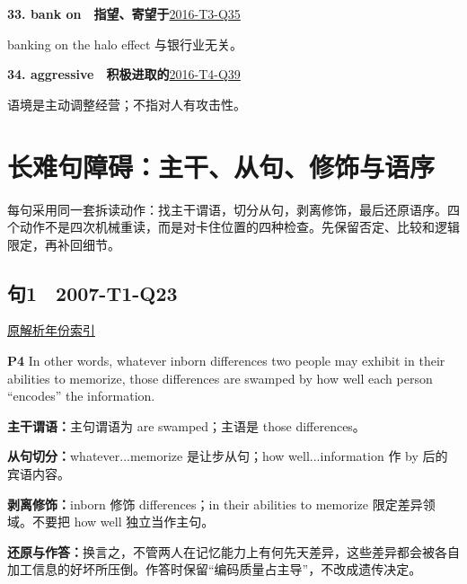 \documentclass[11pt,a4paper]{article}
\begin{document}
\noindent\textbf{33. bank on　指望、寄望于}\hfill \hyperref[idx-2016-T3-Q35]{2016-T3-Q35}\par
banking on the halo effect 与银行业无关。\par
{}\noindent\textbf{34. aggressive　积极进取的}\hfill \hyperref[idx-2016-T4-Q39]{2016-T4-Q39}\par
语境是主动调整经营；不指对人有攻击性。\par
\clearpage\section{长难句障碍：主干、从句、修饰与语序}\label{syntax}
每句采用同一套拆读动作：找主干谓语，切分从句，剥离修饰，最后还原语序。四个动作不是四次机械重读，而是对卡住位置的四种检查。先保留否定、比较和逻辑限定，再补回细节。\par
{}
\subsection{句1　2007-T1-Q23}
\noindent \href{https://zj139.github.io/math-notes/english/a69829b7fe6a2f532d31c053/\#q23}{原解析}\quad \hyperref[idx-2007-T1-Q23]{年份索引}
\begin{evidence}\textbf{P4} In other words, whatever inborn differences two people may exhibit in their abilities to memorize, those differences are swamped by how well each person “encodes” the information.\end{evidence}
\noindent\textbf{主干谓语：}主句谓语为 are swamped；主语是 those differences。\par
\noindent\textbf{从句切分：}whatever...memorize 是让步从句；how well...information 作 by 后的宾语内容。\par
\noindent\textbf{剥离修饰：}inborn 修饰 differences；in their abilities to memorize 限定差异领域。不要把 how well 独立当作主句。\par
\noindent\textbf{还原与作答：}换言之，不管两人在记忆能力上有何先天差异，这些差异都会被各自加工信息的好坏所压倒。作答时保留“编码质量占主导”，不改成遗传决定。\par
{}
\end{document}
